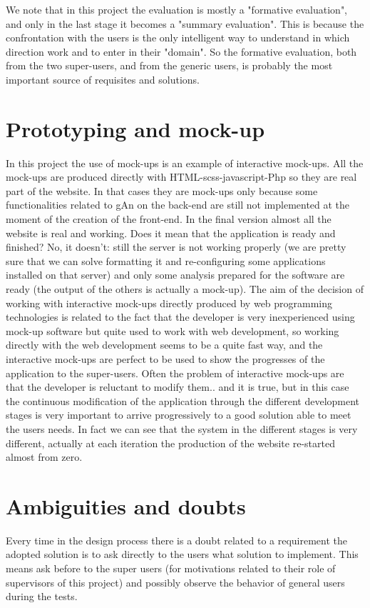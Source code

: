 We note that in this project the evaluation is mostly a "formative evaluation", and only in the last stage it becomes a "summary evaluation". This is because the confrontation with the users is the only intelligent way to understand in which direction work and to enter in their "domain". So the formative evaluation, both from the two super-users, and from the generic users, is probably the most important source of requisites and solutions.   

\section{Prototyping and mock-up}
In this project the use of mock-ups is an example of interactive mock-ups. All the mock-ups are produced directly with HTML-scss-javascript-Php so they are real part of the website. In that cases they are mock-ups only because some functionalities related to gAn on the back-end are still not implemented at the moment of the creation of the front-end. In the final version almost all the website is real and working. Does it mean that the application is ready and finished? No, it doesn't: still the server is not working properly (we are pretty sure that we can solve formatting it and re-configuring some applications installed on that server) and only some analysis prepared for the software are ready (the output of the others is actually a mock-up). The aim of the decision of working with interactive mock-ups directly produced by web programming technologies is related to the fact that the developer is very inexperienced using mock-up software but quite used to work with web development, so working directly with the web development seems to be a quite fast way, and the interactive mock-ups are perfect to be used to show the progresses of the application to the super-users.
Often the problem of interactive mock-ups are that the developer is reluctant to modify them.. and it is true, but in this case the continuous modification of the application through the different development stages is very important to arrive progressively to a good solution able to meet the users needs. In fact we can see that the system in the different stages is very different, actually at each iteration the production of the website re-started almost from zero. 

\section{Ambiguities and doubts}
Every time in the design process there is a doubt related to a requirement the adopted solution is to ask directly to the users what solution to implement. This means ask before to the super users (for motivations related to their role of supervisors of this project) and possibly observe the behavior of general 
users during the tests.

